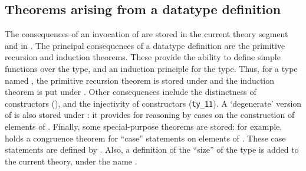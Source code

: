 \subsection{Theorems arising from a datatype definition}

 The consequences of an invocation of  are stored in the
current theory segment and in . The principal consequences
 of a datatype definition are the primitive recursion and induction theorems.
 These provide the ability to define simple functions over the type, and
 an induction principle for the type. Thus, for a type named ,
 the primitive recursion theorem is stored under  and
 the induction theorem is put under . Other
 consequences include the distinctness of constructors (),
 and the injectivity of constructors (\verb+ty_11+). A `degenerate' version of
  is also stored under : it provides
 for reasoning by cases on the construction of elements of .
 Finally, some special-purpose theorems are stored: for example,
  holds a congruence theorem for ``case'' statements
 on elements of . These
 case statements are defined by . Also, a definition of
 the ``size'' of the type is added to the current theory, under the name
 .

